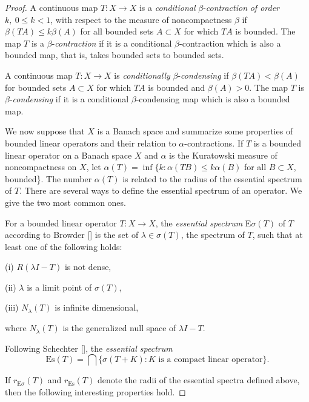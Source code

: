 \documentclass{surv-l}
\theoremstyle{plain}
\theoremstyle{definition}
\numberwithin{equation}{section}
\numberwithin{figure}{chapter}
\begin{document}
\begin{proof}
A continuous map $T\!:X\rightarrow X$ is a \emph{conditional} $\beta$-\emph{contraction} \emph{of order} $k,\ 0\leq k<1$, with respect to the measure of noncompactness $\beta$ if $\beta(TA)\leq k\beta(A)$ for all bounded sets $A\subset X$ for which $TA$ is bounded. The map $T$ is a $\beta$-\emph{contraction} if it is a conditional $\beta$-contraction which is also a bounded map, that is, takes bounded sets to bounded sets.

A continuous map $T\!:X\rightarrow X$ is \emph{conditionally} $\beta$-\emph{condensing} if $\beta(TA)<\beta(A)$ for bounded sets $A\subset X$ for which $TA$ is bounded and $\beta(A)>0$. The map $T$ is $\beta$-\emph{condensing} if it is a conditional $\beta$-condensing map which is also a bounded map.

We now suppose that $X$ is a Banach space and summarize some properties of bounded linear operators and their relation to $\alpha$-contractions. If $T$ is a bounded linear operator on a Banach space $X$ and $\alpha$ is the Kuratowski measure of noncompactness on $X$, let $ \alpha(T)=\inf\{k\!:\alpha(TB)\leq k\alpha(B)$ for all $B\subset X$, bounded\}. The number $\alpha(T)$ is related to the radius of the essential spectrum of $T$. There are several ways to define the essential spectrum of an operator. We give the two most common ones.

For a bounded linear operator $T\!:X\rightarrow X$, the \emph{essential spectrum} E$\sigma(T)$ of $T$ according to Browder [\citeyear{1961b}] is the set of $\lambda \in\sigma(T)$, the spectrum of $T$, such that at least one of the following holds:

(i) $R(\lambda I -T)$ is not dense,

(ii) $\lambda$ is a limit point of $\sigma(T)$,

(iii) $N_{\lambda}(T)$ is infinite dimensional,

\noindent where $N_{\lambda}(T)$ is the generalized null space of $\lambda I-T$.

Following Schechter [\citeyear{1971s}], the \emph{essential spectrum}
\begin{equation*}
\mathrm{Es} (T)=\bigcap\{\sigma(T+K)\!:K   \text{ is  a  compact  linear  operator}\}.
\end{equation*}

If $r_{\mathrm{E}\sigma}(T)$ and $r_\mathrm{Es}(T)$ denote the radii of the essential spectra defined above, then the following interesting properties hold.
\end{proof}
\end{document}
